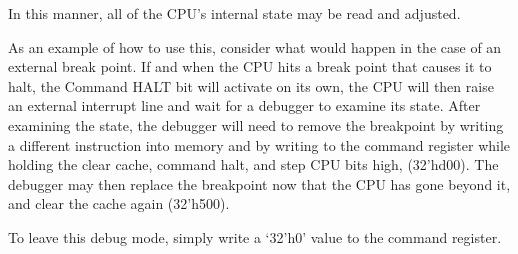 \documentclass{gqtekspec}
\begin{document}
In this manner, all of the CPU's internal state may be read and adjusted.

As an example of how to use this, consider what would happen in the case
of an external break point.  If and when the CPU hits a break point that
causes it to halt, the Command HALT bit will activate on its own, the CPU
will then raise an external interrupt line and wait for a debugger to examine
its state.  After examining the state, the debugger will need to remove
the breakpoint by writing a different instruction into memory and by writing
to the command register while holding the clear cache, command halt, and
step CPU bits high, (32'hd00).  The debugger may then replace the breakpoint
now that the CPU has gone beyond it, and clear the cache again (32'h500).

To leave this debug mode, simply write a `32'h0' value to the command register.
\end{document}

